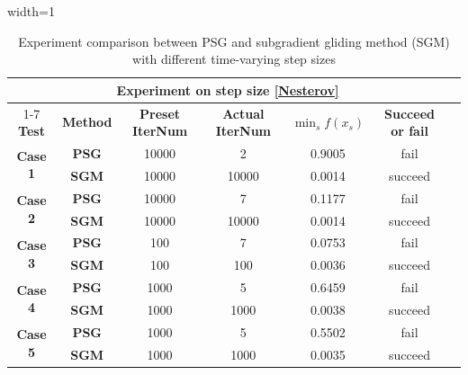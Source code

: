 \documentclass[sn-mathphys]{JORSC-jnl}%
\theoremstyle{thmstyleone}%
\theoremstyle{thmstylethree}%
\begin{document}
\begin{table}[htbp]
	\centering
	\caption{Experiment comparison between PSG and subgradient gliding method (SGM) with different time-varying step sizes}
	\begin{adjustbox}{width=1\textwidth}
		\begin{tabular}{ccccccc}
			\toprule %
			\multicolumn{6}{c}{\textbf{Experiment on step size \eqref{Nesterov}}} & \\
			\cmidrule{1-7} %
			\textbf{Test} & \textbf{Method} & \textbf{Preset IterNum} & \textbf{Actual IterNum} & $\min_{s} f(x_s)$ & \textbf{Succeed or fail}&\\
			\midrule %
			\multirow{2}{*}{\textbf{Case 1}} & \textbf{PSG}& 10000& 2& 0.9005& fail&\\
			\cmidrule{2-7}
			& \textbf{SGM} & 10000 & 10000 & 0.0014 & succeed &\\
			\midrule %
			\multirow{2}{*}{\textbf{Case 2}} & \textbf{PSG}& 10000& 7& 0.1177& fail&\\
			\cmidrule{2-7}
			& \textbf{SGM} & 10000 & 10000 & 0.0014 & succeed &\\
			\midrule %
			\multirow{2}{*}{\textbf{Case 3}} & \textbf{PSG}& 100& 7& 0.0753& fail&\\
			\cmidrule{2-7}
			& \textbf{SGM} & 100 & 100 & 0.0036 & succeed &\\
			\midrule %
			\multirow{2}{*}{\textbf{Case 4}} & \textbf{PSG}& 1000& 5& 0.6459& fail&\\
			\cmidrule{2-7}
			& \textbf{SGM} & 1000 & 1000 & 0.0038 & succeed &\\
			\midrule %
			\multirow{2}{*}{\textbf{Case 5}} & \textbf{PSG}& 1000& 5& 0.5502& fail&\\
			\cmidrule{2-7}
			& \textbf{SGM} & 1000 & 1000 & 0.0035 & succeed &\\
			

\end{tabular}
\end{adjustbox}
\end{table}
\end{document}
